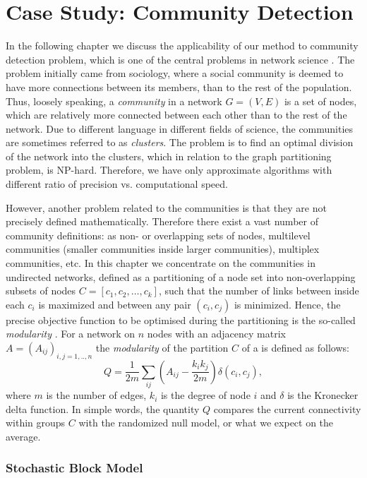 \chapter{Case Study: Community Detection}\label{chap:2}
In the following chapter we discuss the applicability of our method to community detection problem, which is one of the central problems in network science \cite{Fortunato2010}. The problem initially came from sociology, where a social community is deemed to have more connections between its members, than to the rest of the population. Thus, loosely speaking, a \textit{community}  in a network $G=(V,E)$ is a set of nodes, which are relatively more connected between each other than to the rest of the network. Due to different language in different fields of science, the communities are sometimes referred to as \textit{clusters}. The problem is to find an optimal division of the network into the clusters, which in relation to the graph partitioning problem, is NP-hard. Therefore, we have only approximate algorithms with different ratio of precision vs. computational speed.

However, another problem related to the communities is that they are not precisely defined mathematically. Therefore there exist a vast number of community definitions: as non- or overlapping sets of nodes, multilevel communities (smaller communities inside larger communities), multiplex communities, etc. In this chapter we concentrate on the communities in undirected networks, defined as a partitioning of a node set into non-overlapping subsets of nodes $C=[c_1,c_2, \dots, c_k ]$, such that the number of links between inside each $c_i$ is maximized and between any pair $(c_i, c_j)$ is minimized. Hence, the precise objective function to be optimised during the partitioning is the so-called \textit{modularity} \cite{MN2}. For a network on $n$ nodes with an adjacency matrix $A = (A_{ij})_{i,j=1,..,n}$  the \textit{modularity} of the partition $C$ of a is defined as follows:
$$Q = \frac{1}{2m}\sum\limits_{ij}\left(A_{ij} - \frac{k_i k_j}{2m}\right)\delta(c_i,c_j),$$
where $m$ is the number of edges, $k_i$ is the degree of node $i$ and $\delta$ is the Kronecker delta function. In simple words, the quantity $Q$ compares the current connectivity within groups $C$ with the randomized null model, or what we expect on the average. 

\subsection{Stochastic Block Model}

